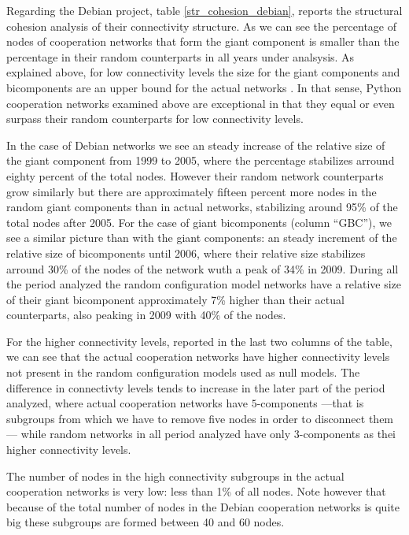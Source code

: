 

Regarding the Debian project, table \ref{str_cohesion_debian}, reports the structural cohesion analysis of their connectivity structure. As we can see the percentage of nodes of cooperation networks that form the giant component is smaller than the percentage in their random counterparts in all years under analsysis. As explained above, for low connectivity levels the size for the giant components and bicomponents are an upper bound for the actual networks \citep{moody:2004}. In that sense, Python cooperation networks examined above are exceptional in that they equal or even surpass their random counterparts for low connectivity levels.

In the case of Debian networks we see an steady increase of the relative size of the giant component from 1999 to 2005, where the percentage stabilizes arround eighty percent of the total nodes. However their random network counterparts grow similarly but there are approximately fifteen percent more nodes in the random giant components than in actual networks, stabilizing around 95\% of the total nodes after 2005. For the case of giant bicomponents (column ``GBC''), we see a similar picture than with the giant components: an steady increment of the relative size of bicomponents until 2006, where their relative size stabilizes arround 30\% of the nodes of the network wuth a peak of 34\% in 2009. During all the period analyzed the random configuration model networks have a relative size of their giant bicomponent approximately 7\% higher than their actual counterparts, also peaking in 2009 with 40\% of the nodes.   

For the higher connectivity levels, reported in the last two columns of the table, we can see that the actual cooperation networks have higher connectivity levels not present in the random configuration models used as null models. The difference in connectivty levels tends to increase in the later part of the period analyzed, where actual cooperation networks have $5$-components ---that is subgroups from which we have to remove five nodes in order to disconnect them--- while random networks in all period analyzed have only $3$-components as thei higher connectivity levels.

The number of nodes in the high connectivity subgroups in the actual cooperation networks is very low: less than 1\% of all nodes. Note however that because of the total number of nodes in the Debian cooperation networks is quite big these subgroups are formed between 40 and 60 nodes. 

